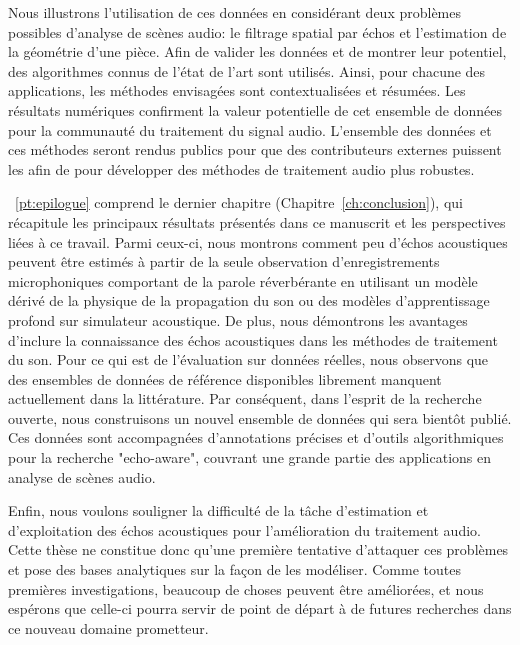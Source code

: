 \begin{itemize}
    Nous illustrons l'utilisation de ces données en considérant deux problèmes possibles d'analyse de scènes audio:
    le filtrage spatial par échos et l'estimation de la géométrie d'une pièce.
    Afin de valider les données et de montrer leur potentiel, des algorithmes connus de l'état de l'art sont utilisés.
    Ainsi, pour chacune des applications, les méthodes envisagées sont contextualisées et résumées.
    Les résultats numériques confirment la valeur potentielle de cet ensemble de données pour la communauté du traitement du signal audio.
    L'ensemble des données et ces méthodes seront rendus publics pour que des contributeurs externes puissent les afin de pour développer des méthodes de traitement audio plus robustes.
\end{itemize}

~\ref{pt:epilogue} comprend le dernier chapitre (Chapitre~\ref{ch:conclusion}), qui récapitule les principaux résultats présentés dans ce manuscrit et les perspectives liées à ce travail.
Parmi ceux-ci, nous montrons comment peu d'échos acoustiques peuvent être estimés à partir de la seule observation d'enregistrements microphoniques comportant de la parole réverbérante en utilisant un modèle dérivé de la physique de la propagation du son ou des modèles d'apprentissage profond sur simulateur acoustique.
De plus, nous démontrons les avantages d'inclure la connaissance des échos acoustiques dans les méthodes de traitement du son.
Pour ce qui est de l'évaluation sur données réelles, nous observons que des ensembles de données de référence disponibles librement manquent actuellement dans la littérature.
Par conséquent, dans l'esprit de la recherche ouverte, nous construisons un nouvel ensemble de données qui sera bientôt publié.
Ces données sont accompagnées d'annotations précises et d'outils algorithmiques pour la recherche "echo-aware", couvrant une grande partie des applications en analyse de scènes audio.

\mynewline
Enfin, nous voulons souligner la difficulté de la tâche d'estimation et d'exploitation des échos acoustiques pour l'amélioration du traitement audio.
Cette thèse ne constitue donc qu'une première tentative d'attaquer ces problèmes et pose des bases analytiques sur la façon de les modéliser.
Comme toutes premières investigations, beaucoup de choses peuvent être améliorées, et nous espérons que celle-ci pourra servir de point de départ à de futures recherches dans ce nouveau domaine prometteur.